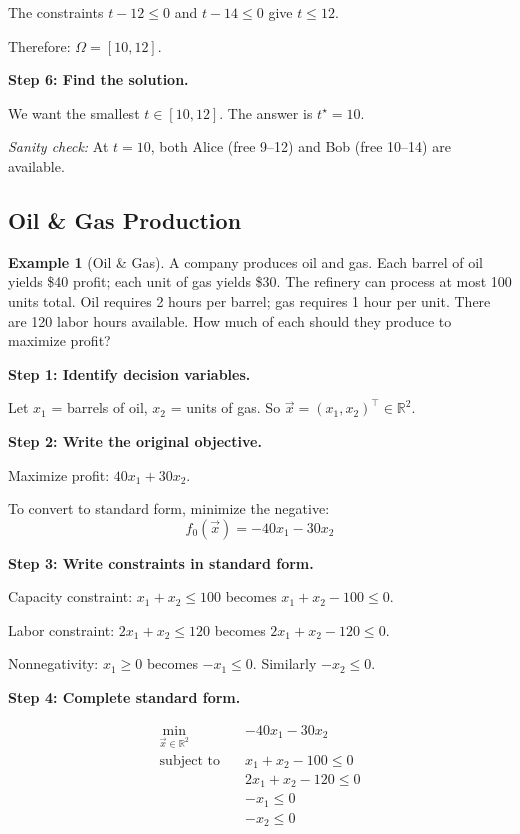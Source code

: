 \documentclass[10pt, twocolumn]{article}
\theoremstyle{definition}
\newtheorem{example}{Example}
\theoremstyle{plain}
\newcommand{\RR}{\mathbb{R}}
\begin{document}
The constraints $t - 12 \le 0$ and $t - 14 \le 0$ give $t \le 12$.

Therefore: $\Omega = [10, 12]$.

\textbf{Step 6: Find the solution.}

We want the smallest $t \in [10, 12]$. The answer is $t^\star = 10$.

\textit{Sanity check:} At $t = 10$, both Alice (free 9--12) and Bob (free 10--14) are available. \checkmark

\subsection{Oil \& Gas Production}

\begin{example}[Oil \& Gas]
A company produces oil and gas. Each barrel of oil yields \$40 profit; each unit of gas yields \$30. The refinery can process at most 100 units total. Oil requires 2 hours per barrel; gas requires 1 hour per unit. There are 120 labor hours available. How much of each should they produce to maximize profit?
\end{example}

\textbf{Step 1: Identify decision variables.}

Let $x_1$ = barrels of oil, $x_2$ = units of gas. So $\vec{x} = (x_1, x_2)^\top \in \RR^2$.

\textbf{Step 2: Write the original objective.}

Maximize profit: $40x_1 + 30x_2$.

To convert to standard form, minimize the negative:
\[
    f_0(\vec{x}) = -40x_1 - 30x_2
\]

\textbf{Step 3: Write constraints in standard form.}

Capacity constraint: $x_1 + x_2 \le 100$ becomes $x_1 + x_2 - 100 \le 0$.

Labor constraint: $2x_1 + x_2 \le 120$ becomes $2x_1 + x_2 - 120 \le 0$.

Nonnegativity: $x_1 \ge 0$ becomes $-x_1 \le 0$. Similarly $-x_2 \le 0$.

\textbf{Step 4: Complete standard form.}

\begin{result}
\[
\begin{aligned}
    \min_{\vec{x} \in \RR^2} \quad & -40x_1 - 30x_2 \\
    \text{subject to} \quad & x_1 + x_2 - 100 \le 0 \\
    & 2x_1 + x_2 - 120 \le 0 \\
    & -x_1 \le 0 \\
    & -x_2 \le 0
\end{aligned}
\]
\end{result}
\end{document}
